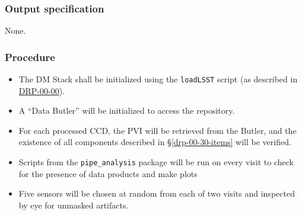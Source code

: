 \subsubsection{Output specification}

None.

\subsubsection{Procedure}

\begin{itemize}

  \item{The DM Stack shall be initialized using the \texttt{loadLSST} script
  (as described in \hyperref[drp-00-00]{DRP-00-00}).}

  \item{A ``Data Butler'' will be initialized to access the repository.}

  \item{For each processed CCD, the PVI will be retrieved from the Butler, and
  the existence of all components described in \S\ref{drp-00-30-items} will be
  verified.}

  \item{Scripts from the \texttt{pipe\_analysis} package will be run on every visit to check for the presence of data products and make plots}

  \item{Five sensors will be chosen at random from each of two visits and inspected by eye for unmasked artifacts.}

\end{itemize}
